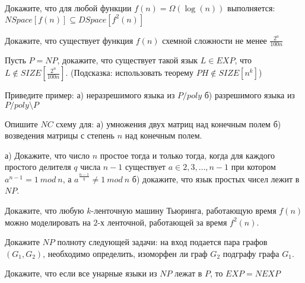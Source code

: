 \setcounter{curtask}{17}


\begin{task}
    Докажите, что для любой функции $f(n) = \Omega(\log(n))$ выполняется:
    $NSpace[f(n)] \subseteq DSpace[f^2(n)]$
\end{task}

\begin{task}
    Докажите, что существует функция $f(n)$ схемной сложности не менее $\frac{2^n}{100n}$
\end{task}

\begin{task}
    Пусть $P = NP$, докажите, что существует такой язык $L \in EXP$, что
    $L \notin SIZE[\frac{2^n}{100n}]$. (Подсказка: использовать теорему $PH \notin SIZE[n^k]$)
\end{task}

\begin{task}
    Приведите пример:
    а) неразрешимого языка из $P/poly$
    б) разрешимого языка из $P/poly \setminus P$
\end{task}

\begin{task}
	Опишите $NC$ схему для:
    а) умножения двух матриц над конечным полем
    б) возведения матрицы с степень $n$ над конечным полем.
\end{task}

\breakline

\begin{ptask}{4}
    а) Докажите, что число $n$ простое тогда и только тогда, когда для каждого
    простого делителя $q$ числа $n - 1$ существует $a \in {2, 3, \dots, n - 1}$ при котором
    $a^{n - 1} = 1~mod~n$, а $a^{\frac{n - 1}{q}} \ne 1~mod~n$
    б) докажите, что язык простых чисел лежит в $NP$.
\end{ptask}

\begin{ptask}{8}
    Докажите, что любую $k$-ленточную машину Тьюринга, работающую время $f(n)$ можно
    моделировать на $2$-х ленточной, работающей за время $f^2(n)$.
\end{ptask}

\begin{ptask}{10}
    Докажите $NP$ полноту следующей задачи:
    на вход подается пара графов $(G_1, G_2)$, необходимо определить, изоморфен ли
    граф $G_2$ подграфу графа $G_1$.
\end{ptask}

\begin{ptask}{11}
	Докажите, что если все унарные языки из $NP$ лежат в $P$, то $EXP = NEXP$
\end{ptask}

